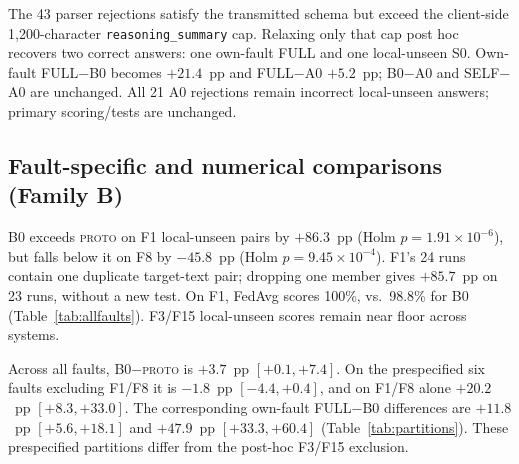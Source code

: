 \documentclass[conference]{IEEEtran}
\newcommand{\PROTO}{\textsc{proto}}
\newcommand{\cond}[1]{\textsf{#1}}
\begin{document}
The 43 parser rejections satisfy the transmitted schema but exceed the client-side 1,200-character \texttt{reasoning\_summary} cap. Relaxing only that cap post hoc recovers two correct answers: one own-fault \cond{FULL} and one local-unseen \cond{S0}. Own-fault \cond{FULL}$-$\cond{B0} becomes $+21.4$~pp and \cond{FULL}$-$\cond{A0} $+5.2$~pp; \cond{B0}$-$\cond{A0} and \cond{SELF}$-$\cond{A0} are unchanged. All 21 \cond{A0} rejections remain incorrect local-unseen answers; primary scoring/tests are unchanged.

\begin{table}[t]
\centering\footnotesize
\caption{LLM own-fault contrast by fault: paired \cond{FULL}$-$\cond{B0} difference and counts of gained, lost and tied runs (24 per fault). Descriptive decomposition of Family A.}
\label{tab:faults}
\setlength{\tabcolsep}{2.5pt}

\end{table}

\begin{table}[!t]
\centering\footnotesize
\caption{Fixed-denominator accuracy by fault for every LLM condition and both numerical references. Each own-fault value has 24 physical runs; each local-unseen value has the same 24 runs evaluated for seven receivers. These are descriptive rates, not additional fault-level tests.}
\label{tab:allfaults}
\setlength{\tabcolsep}{6.5pt}

\end{table}

\subsection{Fault-specific and numerical comparisons (Family B)}
\cond{B0} exceeds \PROTO{} on F1 local-unseen pairs by $+86.3$~pp (Holm $p=1.91\times10^{-6}$), but falls below it on F8 by $-45.8$~pp (Holm $p=9.45\times10^{-4}$). F1's 24 runs contain one duplicate target-text pair; dropping one member gives $+85.7$~pp on 23 runs, without a new test. On F1, FedAvg scores 100\%, vs.\ 98.8\% for \cond{B0} (Table~\ref{tab:allfaults}). F3/F15 local-unseen scores remain near floor across systems.

Across all faults, \cond{B0}$-$\PROTO{} is $+3.7$~pp $[+0.1,+7.4]$. On the prespecified six faults excluding F1/F8 it is $-1.8$~pp $[-4.4,+0.4]$, and on F1/F8 alone $+20.2$~pp $[+8.3,+33.0]$. The corresponding own-fault \cond{FULL}$-$\cond{B0} differences are $+11.8$~pp $[+5.6,+18.1]$ and $+47.9$~pp $[+33.3,+60.4]$ (Table~\ref{tab:partitions}). These prespecified partitions differ from the post-hoc F3/F15 exclusion.
\end{document}
